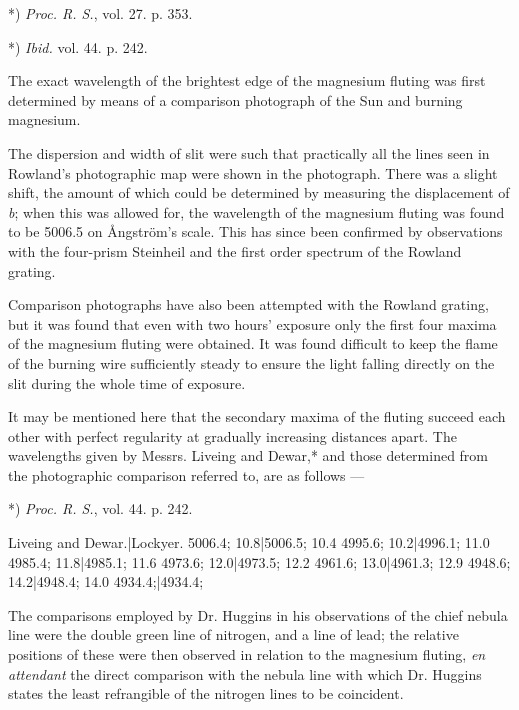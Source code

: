 \documentclass[a4paper, 12pt, oneside, polutonikogreek, english]{article}
\begin{document}
*) \emph{Proc. R. S.}, vol. 27. p. 353.

*) \emph{Ibid.} vol. 44. p. 242.

The exact wavelength of the brightest edge of the magnesium fluting was first determined by means of a comparison photograph of the Sun and burning magnesium.

The dispersion and width of slit were such that practically all the lines seen in Rowland's photographic map were shown in the photograph. There was a slight shift, the amount of which could be determined by measuring the displacement of \emph{b}; when this was allowed for, the wavelength of the magnesium fluting was found to be 5006.5 on Ångström's scale. This has since been confirmed by observations with the four-prism Steinheil and the first order spectrum of the Rowland grating.

Comparison photographs have also been attempted with the Rowland grating, but it was found that even with two hours' exposure only the first four maxima of the magnesium fluting were obtained. It was found difficult to keep the flame of the burning wire sufficiently steady to ensure the light falling directly on the slit during the whole time of exposure.

It may be mentioned here that the secondary maxima of the fluting succeed each other with perfect regularity at gradually increasing distances apart. The wavelengths given by Messrs. Liveing and Dewar,* and those determined from the photographic comparison referred to, are as follows ---

*) \emph{Proc. R. S.}, vol. 44. p. 242.

Liveing and Dewar.|Lockyer. 
5006.4; 10.8|5006.5; 10.4 
4995.6; 10.2|4996.1; 11.0 
4985.4; 11.8|4985.1; 11.6 
4973.6; 12.0|4973.5; 12.2 
4961.6; 13.0|4961.3; 12.9 
4948.6; 14.2|4948.4; 14.0 
4934.4;|4934.4;

The comparisons employed by Dr. Huggins in his observations of the chief nebula line were the double green line of nitrogen, and a line of lead; the relative positions of these were then observed in relation to the magnesium fluting, \emph{en attendant} the direct comparison with the nebula line with which Dr. Huggins states the least refrangible of the nitrogen lines to be coincident.
\end{document}
